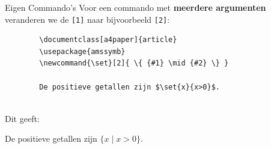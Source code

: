 \begin{frame}[fragile]{Eigen Commando's}
    Voor een commando met \textbf{meerdere argumenten} veranderen we de 
    \texttt{[1]} naar bijvoorbeeld \texttt{[2]}:
    \begin{verbatim}
        \documentclass[a4paper]{article}
        \usepackage{amssymb}
        \newcommand{\set}[2]{ \{ {#1} \mid {#2} \} }
        
        De positieve getallen zijn $\set{x}{x>0}$.
        
    \end{verbatim} 
    \renewcommand{\set}[2]{ \{ {#1} \mid {#2} \} }
    \pause
    Dit geeft:
    \begin{tcolorbox}[boxrule=0.5pt, colback=white]
        De positieve getallen zijn $\set{x}{x>0}$.
    \end{tcolorbox}
\end{frame}